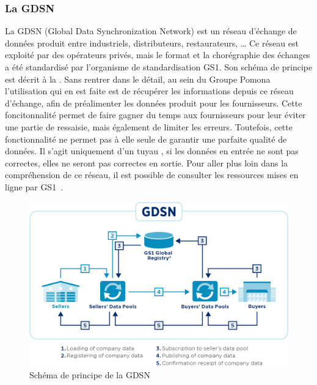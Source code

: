                 \subsubsection{La GDSN}

                \label{GDSN}
                La GDSN (Global Data Synchronization Network) est un réseau d'échange de données produit entre industriels, distributeurs, restaurateurs, \dots
                Ce réseau est exploité par des opérateurs privés, mais le format et la chorégraphie des échanges a été standardisé par l'organisme de standardisation GS1.
                Son schéma de principe est décrit à la .
                Sans rentrer dans le détail, au sein du Groupe Pomona l'utilisation qui en est faite est de récupérer les informations depuis ce réseau d'échange, afin de préalimenter les données produit pour les fournisseurs.
                Cette foncitonnalité permet de faire gagner du temps aux fournisseurs pour leur éviter une partie de ressaisie, mais également de limiter les erreurs.
                Toutefois, cette fonctionnalité ne permet pas à elle seule de garantir une parfaite qualité de données.
                Il s'agit uniquement d'un \og tuyau \fg, si les données en entrée ne sont pas correctes, elles ne seront pas correctes en sortie.
                Pour aller plus loin dans la compréhension de ce réseau, il est possible de consulter les ressources mises en ligne par GS1~\cite{GDSN_GS1_FR}\cite{GDSN_GS1_GLOBAL}.

                \begin{figure}[htpb]
                    \begin{center}
                    \includegraphics[width=\linewidth]{img/gdsn-schema.png}
                    \end{center}
                    \caption{Schéma de principe de la GDSN}
                    \label{fig:GDSN}
                \end{figure}                 
                
